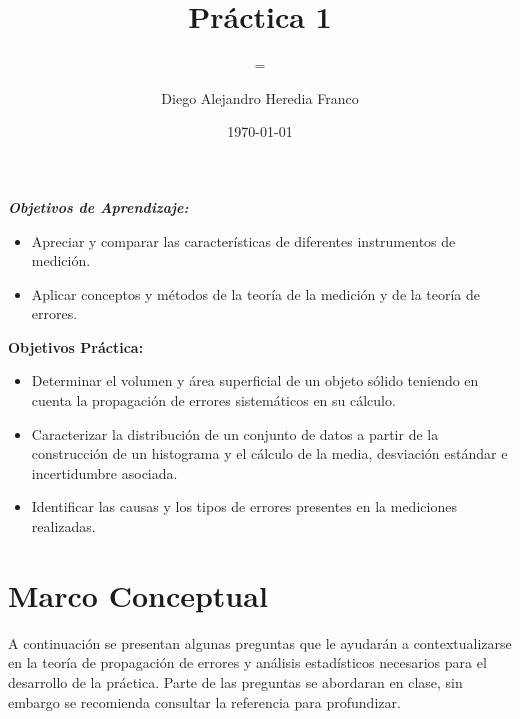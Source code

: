 \documentclass{replab}
\title{Práctica 1}
\author{Diego Alejandro Heredia Franco}
\date{\today}
\subtitle={Propagación de Errores en Mediciones}
\begin{document}
\setlength{\parindent}{0pt}
	
	\pagestyle{fancy}
	\unspacedoperators
	

		\begin{center}
			\maketitle
			
			{\begin{tcolorbox}[colframe=white, colback=principaldos, arc=8pt]
				\textit{\textbf{Objetivos de Aprendizaje:}}

				\begin{itemize}
					\item Apreciar y comparar las características de diferentes instrumentos de medición.
					\item Aplicar conceptos y métodos de la teoría de la medición y de la teoría de errores.
				\end{itemize}

				\textbf{Objetivos Práctica:}

				\begin{itemize}
					\item Determinar el volumen y área superficial de un objeto sólido teniendo en cuenta la propagación de errores sistemáticos en su cálculo.
					\item Caracterizar la distribución de un conjunto de datos a partir de la construcción de un histograma y el cálculo de la media, desviación estándar e incertidumbre asociada.
					\item Identificar las causas y los tipos de errores presentes en la mediciones realizadas.
				\end{itemize}


			\end{tcolorbox}}
		\end{center}

	
	\section{Marco Conceptual}

	A continuación se presentan algunas preguntas que le ayudarán a contextualizarse en la teoría de propagación de errores y análisis estadísticos necesarios para el desarrollo de la práctica. Parte de las preguntas se abordaran en clase, sin embargo se recomienda consultar la referencia \cite{ardila} para profundizar.
	
\end{document}
